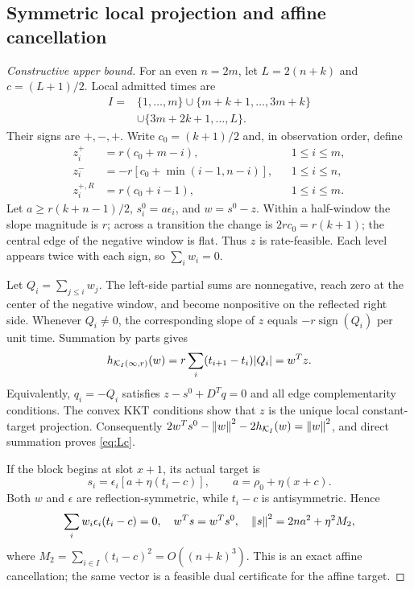 \subsection{Symmetric local projection and affine cancellation}
\begin{proof}[Constructive upper bound]
For an even $n=2m$, let $L=2(n+k)$ and $c=(L+1)/2$. Local admitted times are
\begin{equation}
\begin{split}
 I={}&\{1,\ldots,m\}\cup\{m+k+1,\ldots,3m+k\}\\
 &\cup\{3m+2k+1,\ldots,L\}.
\end{split}
\end{equation}
Their signs are $+,-,+$. Write $c_0=(k+1)/2$ and, in observation order, define
\begin{align}
 z^+_{i}&=r(c_0+m-i),&&1\le i\le m,\nonumber\\
 z^-_{i}&=-r[c_0+\min(i-1,n-i)],&&1\le i\le n,\nonumber\\
 z^{+,R}_{i}&=r(c_0+i-1),&&1\le i\le m.\label{eq:localz}
\end{align}
Let $a\ge r(k+n-1)/2$, $s_i^0=a\epsilon_i$, and $w=s^0-z$. Within a half-window the slope magnitude is $r$; across a transition the change is $2rc_0=r(k+1)$; the central edge of the negative window is flat. Thus $z$ is rate-feasible. Each level appears twice with each sign, so $\sum_iw_i=0$.

Let $Q_i=\sum_{j\le i}w_j$. The left-side partial sums are nonnegative, reach zero at the center of the negative window, and become nonpositive on the reflected right side. Whenever $Q_i\ne0$, the corresponding slope of $z$ equals $-r\operatorname{sign}(Q_i)$ per unit time. Summation by parts gives
\begin{equation}
 h_{\mathcal K_I(\infty,r)}(w)
 =r\sum_i(t_{i+1}-t_i)|Q_i|=w^Tz.
\end{equation}
Equivalently, $q_i=-Q_i$ satisfies $z-s^0+D^Tq=0$ and all edge complementarity conditions. The convex KKT conditions show that $z$ is the unique local constant-target projection. Consequently $2w^Ts^0-\left\lVert w\right\rVert^2-2h_{\mathcal K_I}(w)=\left\lVert w\right\rVert^2$, and direct summation proves \eqref{eq:Lc}.

If the block begins at slot $x+1$, its actual target is
\begin{equation}
 s_i=\epsilon_i[a+\eta(t_i-c)],\qquad a=\rho_0+\eta(x+c).
\end{equation}
Both $w$ and $\epsilon$ are reflection-symmetric, while $t_i-c$ is antisymmetric. Hence
\begin{equation}
 \sum_iw_i\epsilon_i(t_i-c)=0,
 \quad w^Ts=w^Ts^0,
 \quad\left\lVert s\right\rVert^2=2na^2+\eta^2M_2,
\end{equation}
where $M_2=\sum_{i\in I}(t_i-c)^2=O((n+k)^3)$. This is an exact affine cancellation; the same vector is a feasible dual certificate for the affine target.


\end{proof}

